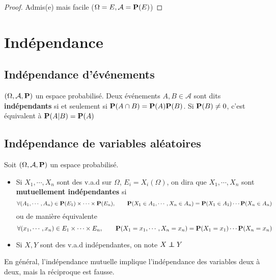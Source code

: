 \begin{proof}
    Admis(e) mais facile ($\Omega=E, \mathcal A=\mathcal \P(E)$)
\end{proof}

\section{Indépendance}

\subsection{Indépendance d'événements}

\begin{dfn}
    $(\Omega, \mathcal A, \P)$ un espace probabilisé. Deux événements $A,B\in \mathcal A$ sont dits \textbf{indépendants} si et seulement si $\P(A\cap B)=\P(A)\P(B)$. Si $\P(B)\neq 0$, c'est équivalent à $\P(A|B)=\P(A)$
\end{dfn}

\subsection{Indépendance de variables aléatoires}

\begin{dfn}
    Soit $(\Omega, \mathcal A, \P)$ un espace probabilisé. \begin{itemize}
        \item Si $X_1, \cdots, X_n$ sont des v.a.d sur $\Omega$, $E_i=X_i(\Omega)$, on dira que $X_1, \cdots,X_n$ sont \textbf{mutuellement indépendantes} si \[
                \forall (A_1,\cdots,A_n)\in \mathcal \P(E_1)\times \cdots \times \mathcal \P(E_n), \qquad \P(X_1\in  A_1,\cdots,X_n\in A_n)=\P(X_1\in A_1)\cdots \P(X_n\in A_n)
        \] ou de manière équivalente \[
        \forall (x_1,\cdots,x_n)\in E_1\times \cdots \times E_n, \qquad \P(X_1=x_1,\cdots,X_n=x_n)=\P(X_1=x_1)\cdots \P(X_n=x_n)
        \] 
    \item Si $X, Y$ sont des v.a.d indépendantes, on note $X\indep Y$
    \end{itemize}
\end{dfn}

\begin{rem}
    En général, l'indépendance mutuelle implique l'indépendance des variables deux à deux, mais la réciproque est fausse.
\end{rem}

